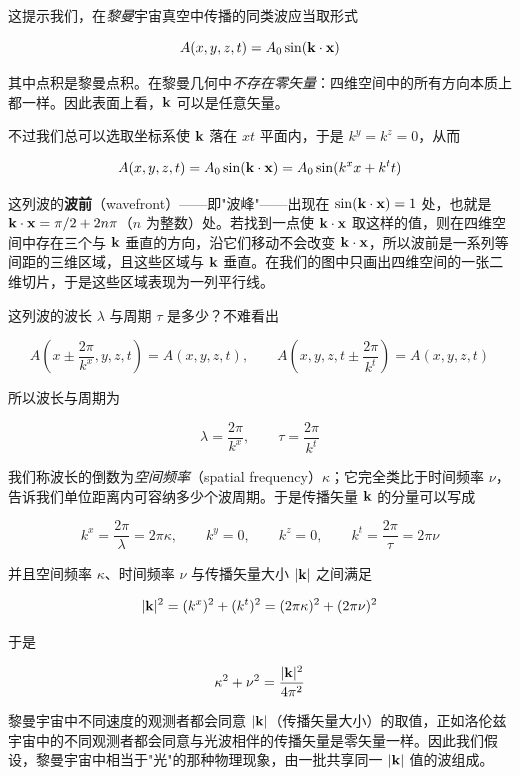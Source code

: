
这提示我们，在\emph{黎曼}宇宙真空中传播的同类波应当取形式

\[
A(x,y,z,t)=A_{0}\sin(\mathbf{k}\cdot\mathbf{x})
\]

其中点积是黎曼点积。在黎曼几何中\emph{不存在零矢量}：四维空间中的所有方向本质上都一样。因此表面上看，$\mathbf{k}$ 可以是任意矢量。

不过我们总可以选取坐标系使 $\mathbf{k}$ 落在 $xt$ 平面内，于是 $k^{y}=k^{z}=0$，从而

\[
A(x,y,z,t)=A_{0}\sin(\mathbf{k}\cdot\mathbf{x})=A_{0}\sin(k^{x}x+k^{t}t)
\]

这列波的\textbf{波前}（wavefront）——即"波峰"——出现在 $\sin(\mathbf{k}\cdot\mathbf{x})=1$ 处，也就是 $\mathbf{k}\cdot\mathbf{x}=\pi/2+2n\pi$（$n$ 为整数）处。若找到一点使 $\mathbf{k}\cdot\mathbf{x}$ 取这样的值，则在四维空间中存在三个与 $\mathbf{k}$ 垂直的方向，沿它们移动不会改变 $\mathbf{k}\cdot\mathbf{x}$，所以波前是一系列等间距的三维区域，且这些区域与 $\mathbf{k}$ 垂直。在我们的图中只画出四维空间的一张二维切片，于是这些区域表现为一列平行线。

这列波的波长 $\lambda$ 与周期 $\tau$ 是多少？不难看出

\[
A\!\left(x\pm\frac{2\pi}{k^{x}},y,z,t\right)=A(x,y,z,t),\qquad
A\!\left(x,y,z,t\pm\frac{2\pi}{k^{t}}\right)=A(x,y,z,t)
\]

所以波长与周期为

\[
\lambda=\frac{2\pi}{k^{x}},\qquad \tau=\frac{2\pi}{k^{t}}
\]

我们称波长的倒数为\emph{空间频率}（spatial frequency）$\kappa$；它完全类比于时间频率 $\nu$，告诉我们单位距离内可容纳多少个波周期。于是传播矢量 $\mathbf{k}$ 的分量可以写成

\[
k^{x}=\frac{2\pi}{\lambda}=2\pi\kappa,\qquad k^{y}=0,\qquad k^{z}=0,\qquad k^{t}=\frac{2\pi}{\tau}=2\pi\nu
\]

并且空间频率 $\kappa$、时间频率 $\nu$ 与传播矢量大小 $|\mathbf{k}|$ 之间满足

\[
|\mathbf{k}|^{2}=(k^{x})^{2}+(k^{t})^{2}=(2\pi\kappa)^{2}+(2\pi\nu)^{2}
\]

于是

\[
\kappa^{2}+\nu^{2}=\frac{|\mathbf{k}|^{2}}{4\pi^{2}}
\]

黎曼宇宙中不同速度的观测者都会同意 $|\mathbf{k}|$（传播矢量大小）的取值，正如洛伦兹宇宙中的不同观测者都会同意与光波相伴的传播矢量是零矢量一样。因此我们假设，黎曼宇宙中相当于"光"的那种物理现象，由一批共享同一 $|\mathbf{k}|$ 值的波组成。

